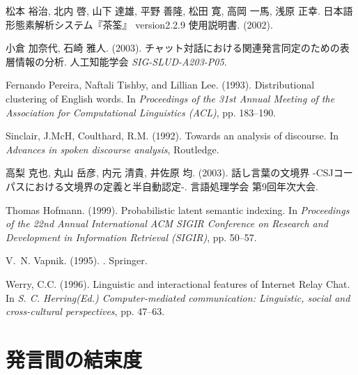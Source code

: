 \begin{thebibliography}{}
松本 裕治, 北内 啓, 山下 達雄, 平野 善隆, 松田 寛, 高岡 一馬, 浅原 正幸. 
\newblock 日本語形態素解析システム『茶筌』 version2.2.9 使用説明書. (2002). 


小倉 加奈代, 石崎 雅人. (2003). 
\newblock チャット対話における関連発言同定のための表層情報の分析. 
\newblock 人工知能学会 {\em SIG-SLUD-A203-P05}.

Fernando Pereira, Naftali Tishby, and Lillian Lee. (1993). 
\newblock Distributional clustering of {E}nglish words.
\newblock In {\em Proceedings of the 31st Annual Meeting of the Association for
  Computational Linguistics (ACL)}, pp. 183--190.


Sinclair, J.McH, Coulthard, R.M. (1992). 
\newblock Towards an analysis of discourse. 
\newblock In {\em Advances in spoken discourse analysis}, Routledge.



高梨 克也, 丸山 岳彦, 内元 清貴, 井佐原 均. (2003). 
\newblock 話し言葉の文境界 -CSJコーパスにおける文境界の定義と半自動認定-. 
\newblock 言語処理学会 第9回年次大会.

Thomas Hofmann. (1999). 
\newblock Probabilistic latent semantic indexing.
\newblock In {\em Proceedings of the 22nd Annual International ACM SIGIR
  Conference on Research and Development in Information Retrieval (SIGIR)}, pp.
  50--57.

V.~N. Vapnik. (1995). 
.
\newblock Springer.

Werry, C.C. (1996). 
\newblock Linguistic and interactional features of Internet Relay
Chat.
\newblock In {\em S. C. Herring(Ed.)  Computer-mediated communication:
Linguistic, social and cross-cultural perspectives}, pp. 47--63.




\end{thebibliography}


\appendix

\section{発言間の結束度}


